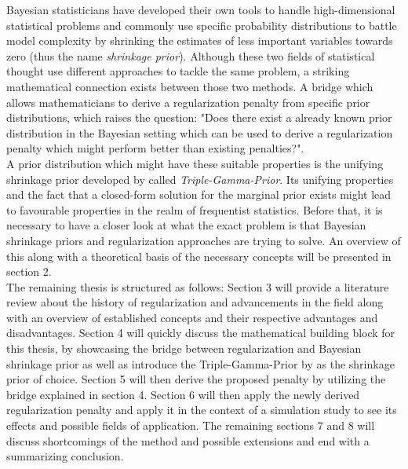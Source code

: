 \documentclass[12pt,a4paper]{article}
\begin{document}
Bayesian statisticians have developed their own tools to handle high-dimensional statistical problems and commonly use specific probability distributions to battle model complexity by shrinking the estimates of less important variables towards zero (thus the name \textit{shrinkage prior}). Although these two fields of statistical thought use different approaches to tackle the same problem, a striking mathematical connection exists between those two methods. A bridge which allows mathematicians to derive a regularization penalty from specific prior distributions, which raises the question: "Does there exist a already known prior distribution in the Bayesian setting which can be used to derive a regularization penalty which might perform better than existing penalties?".\\

A prior distribution which might have these suitable properties is the unifying shrinkage prior developed by \textcite{TGP2020} called \textit{Triple-Gamma-Prior}. Its unifying properties and the fact that a closed-form solution for the marginal prior exists might lead to favourable properties in the realm of frequentist statistics. Before that, it is necessary to have a closer look at what the exact problem is that Bayesian shrinkage priors and regularization approaches are trying to solve. An overview of this along with a theoretical basis of the necessary concepts will be presented in section 2.\\

The remaining thesis is structured as follows: Section 3 will provide a literature review about the history of regularization and advancements in the field along with an overview of established concepts and their respective advantages and disadvantages. Section 4 will quickly discuss the mathematical building block for this thesis, by showcasing the bridge between regularization and Bayesian shrinkage prior as well as introduce the Triple-Gamma-Prior by \textcite{TGP2020} as the shrinkage prior of choice. Section 5 will then derive the proposed penalty by utilizing the bridge explained in section 4. Section 6 will then apply the newly derived regularization penalty and apply it in the context of a simulation study to see its effects and possible fields of application. The remaining sections 7 and 8 will discuss shortcomings of the method and possible extensions and end with a summarizing conclusion. 

\newpage
\end{document}
